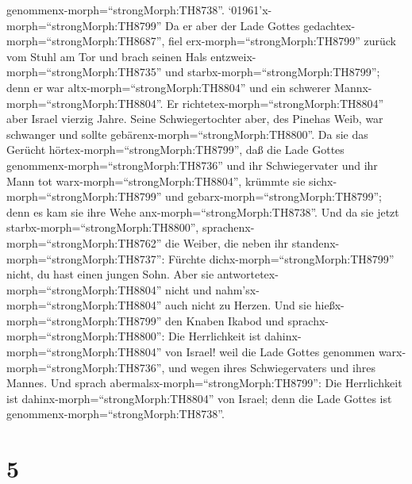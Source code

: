 genommenx-morph=``strongMorph:TH8738''. 
`01961'\textbar x-morph=``strongMorph:TH8799'' Da er aber der Lade
Gottes gedachtex-morph=``strongMorph:TH8687'', fiel
erx-morph=``strongMorph:TH8799'' zurück vom Stuhl am Tor und brach
seinen Hals entzweix-morph=``strongMorph:TH8735'' und
starbx-morph=``strongMorph:TH8799''; denn er war
altx-morph=``strongMorph:TH8804'' und ein schwerer
Mannx-morph=``strongMorph:TH8804''. Er
richtetex-morph=``strongMorph:TH8804'' aber Israel vierzig Jahre.
 Seine Schwiegertochter aber, des Pinehas Weib, war
schwanger und sollte gebärenx-morph=``strongMorph:TH8800''. Da sie das
Gerücht hörtex-morph=``strongMorph:TH8799'', daß die Lade Gottes
genommenx-morph=``strongMorph:TH8736'' und ihr Schwiegervater und ihr
Mann tot warx-morph=``strongMorph:TH8804'', krümmte sie
sichx-morph=``strongMorph:TH8799'' und
gebarx-morph=``strongMorph:TH8799''; denn es kam sie ihre Wehe
anx-morph=``strongMorph:TH8738''.  Und da sie jetzt
starbx-morph=``strongMorph:TH8800'',
sprachenx-morph=``strongMorph:TH8762'' die Weiber, die neben ihr
standenx-morph=``strongMorph:TH8737'': Fürchte
dichx-morph=``strongMorph:TH8799'' nicht, du hast einen jungen Sohn.
Aber sie antwortetex-morph=``strongMorph:TH8804'' nicht und
nahm'sx-morph=``strongMorph:TH8804'' auch nicht zu Herzen. 
Und sie hießx-morph=``strongMorph:TH8799'' den Knaben Ikabod und
sprachx-morph=``strongMorph:TH8800'': Die Herrlichkeit ist
dahinx-morph=``strongMorph:TH8804'' von Israel! weil die Lade Gottes
genommen warx-morph=``strongMorph:TH8736'', und wegen ihres
Schwiegervaters und ihres Mannes.  Und sprach
abermalsx-morph=``strongMorph:TH8799'': Die Herrlichkeit ist
dahinx-morph=``strongMorph:TH8804'' von Israel; denn die Lade Gottes ist
genommenx-morph=``strongMorph:TH8738''.

\hypertarget{section-4}{%
\section{5}\label{section-4}}

